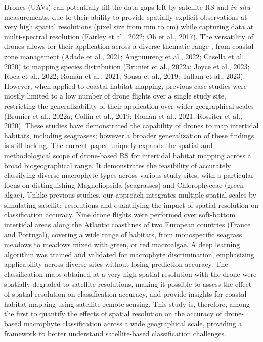 \documentclass[
  letterpaper,
  11pt,
  english,
  singlespacing,
  headsepline]{MastersDoctoralThesis}
\begin{document}
\begin{spacing}{1.5}
Drones (UAVs) can potentially fill the data gaps left by satellite RS
and \emph{in situ} measurements, due to their ability to provide
spatially-explicit observations at very high spatial resolutions (pixel
size from mm to cm) while capturing data at multi-spectral resolution
(Fairley et al., 2022; Oh et al., 2017). The versatility of drones
allows for their application across a diverse thematic range , from
coastal zone management (Adade et al., 2021; Angnuureng et al., 2022;
Casella et al., 2020) to mapping species distribution (Brunier et al.,
2022a; Joyce et al., 2023; Roca et al., 2022; Román et al., 2021; Sousa
et al., 2019; Tallam et al., 2023). However, when applied to coastal
habitat mapping, previous case studies were mostly limited to a low
number of drone flights over a single study site, restricting the
generalizability of their application over wider geographical scales
(Brunier et al., 2022a; Collin et al., 2019; Román et al., 2021;
Rossiter et al., 2020). These studies have demonstrated the capability
of drones to map intertidal habitats, including seagrasses; however a
broader generalization of these findings is still lacking. The current
paper uniquely expands the spatial and methodological scope of
drone-based RS for intertidal habitat mapping across a broad
biogeographical range. It demonstrates the feasibility of accurately
classifying diverse macrophyte types across various study sites, with a
particular focus on distinguishing Magnoliopsida (seagrasses) and
Chlorophyceae (green algae). Unlike previous studies, our approach
integrates multiple spatial scales by simulating satellite resolutions
and quantifying the impact of spatial resolution on classification
accuracy. Nine drone flights were performed over soft-bottom intertidal
areas along the Atlantic coastlines of two European countries (France
and Portugal), covering a wide range of habitats, from monospecific
seagrass meadows to meadows mixed with green, or red macroalgae. A deep
learning algorithm was trained and validated for macrophyte
discrimination, emphasizing applicability across diverse sites without
losing prediction accuracy. The classification maps obtained at a very
high spatial resolution with the drone were spatially degraded to
satellite resolutions, making it possible to assess the effect of
spatial resolution on classification accuracy, and provide insights for
coastal habitat mapping using satellite remote sensing. This study is,
therefore, among the first to quantify the effects of spatial resolution
on the accuracy of drone-based macrophyte classification across a wide
geographical scale, providing a framework to better understand
satellite-based classification challenges.


\end{spacing}
\end{document}
